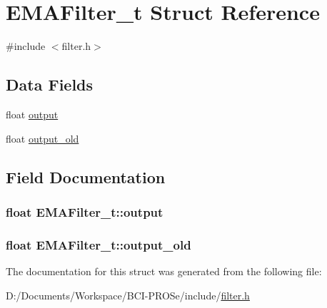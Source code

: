\hypertarget{struct_e_m_a_filter__t}{}\section{E\+M\+A\+Filter\+\_\+t Struct Reference}
\label{struct_e_m_a_filter__t}


{\ttfamily \#include $<$filter.\+h$>$}

\subsection*{Data Fields}
\begin{DoxyCompactItemize}
\item 
float \hyperlink{struct_e_m_a_filter__t_a5f4ae82dea2ce491a097246ec43c0642}{output}
\item 
float \hyperlink{struct_e_m_a_filter__t_a95f3838d3ff8ac8b247155ae81ba0ad3}{output\+\_\+old}
\end{DoxyCompactItemize}


\subsection{Field Documentation}
\subsubsection[{\texorpdfstring{output}{output}}]{\setlength{\rightskip}{0pt plus 5cm}float E\+M\+A\+Filter\+\_\+t\+::output}\hypertarget{struct_e_m_a_filter__t_a5f4ae82dea2ce491a097246ec43c0642}{}\label{struct_e_m_a_filter__t_a5f4ae82dea2ce491a097246ec43c0642}
\subsubsection[{\texorpdfstring{output\+\_\+old}{output_old}}]{\setlength{\rightskip}{0pt plus 5cm}float E\+M\+A\+Filter\+\_\+t\+::output\+\_\+old}\hypertarget{struct_e_m_a_filter__t_a95f3838d3ff8ac8b247155ae81ba0ad3}{}\label{struct_e_m_a_filter__t_a95f3838d3ff8ac8b247155ae81ba0ad3}


The documentation for this struct was generated from the following file\+:\begin{DoxyCompactItemize}
\item 
D\+:/\+Documents/\+Workspace/\+B\+C\+I-\/\+P\+R\+O\+Se/include/\hyperlink{filter_8h}{filter.\+h}\end{DoxyCompactItemize}
